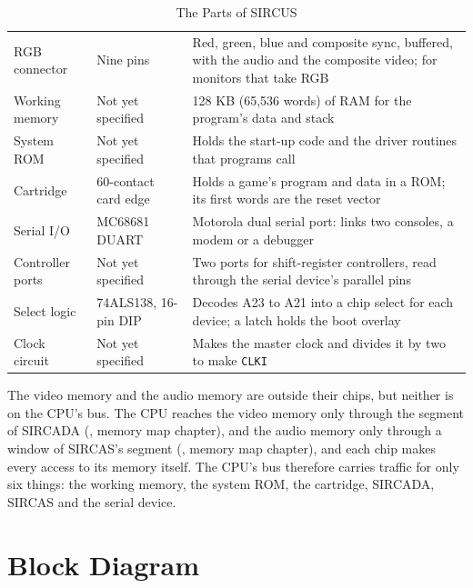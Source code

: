 \begin{table}[H]
\begin{tabular}{llp{5.2cm}}
		RGB connector         & Nine pins            & Red, green, blue and composite sync, buffered, with the audio and the composite video; for monitors that take RGB \\
		Working memory        & Not yet specified    & 128 KB (65,536 words) of RAM for the program's data and stack                                                     \\
		System ROM            & Not yet specified    & Holds the start-up code and the driver routines that programs call                                                \\
		Cartridge             & 60-contact card edge & Holds a game's program and data in a ROM; its first words are the reset vector                                    \\
		Serial I/O            & MC68681 DUART        & Motorola dual serial port: links two consoles, a modem or a debugger                                              \\
		Controller ports      & Not yet specified    & Two ports for shift-register controllers, read through the serial device's parallel pins                          \\
		Select logic          & 74ALS138, 16-pin DIP & Decodes A23 to A21 into a chip select for each device; a latch holds the boot overlay                             \\
		Clock circuit         & Not yet specified    & Makes the master clock and divides it by two to make \texttt{CLKI}                                                \\
		\bottomrule
	\end{tabular}
	\caption{The Parts of SIRCUS}
	\label{tab:parts}
\end{table}

The video memory and the audio memory are outside their chips, but neither is on the CPU's bus. The CPU reaches the
video memory only through the segment of SIRCADA (\videomanual{}, memory map chapter), and the audio memory only
through a window of SIRCAS's segment (\audiomanual{}, memory map chapter), and each chip makes every access to its
memory itself. The CPU's bus therefore carries traffic for only six things: the working memory, the system ROM, the
cartridge, SIRCADA, SIRCAS and the serial device.

\section{Block Diagram}

